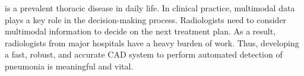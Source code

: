 \documentclass[journal]{IEEEtran}
\begin{document}
 is a prevalent thoracic disease in daily life. In clinical practice, multimodal data plays a key role in the decision-making process. Radiologists need to consider multimodal information to decide on the next treatment plan. As a result, radiologists from major hospitals have a heavy burden of work. Thus, developing a fast, robust, and accurate CAD system to perform automated detection of pneumonia is meaningful and vital. 
\begin{figure}[htbp]
    \centering


\end{figure}
\end{document}
